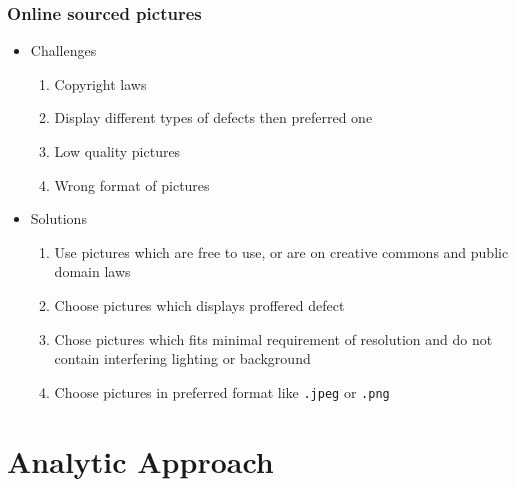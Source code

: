 \documentclass[12pt,a4paper]{article}
\begin{document}
\subsubsection{Online sourced pictures}
\begin{itemize}
    \item Challenges
    \begin{enumerate}
        \item Copyright laws
        \item Display different types of defects then preferred one
        \item Low quality pictures
        \item Wrong format of pictures 
    \end{enumerate}
    \item Solutions
    \begin{enumerate}
        \item Use pictures which are free to use, or are on creative commons and public domain laws 
        \item Choose pictures which displays proffered defect  
        \item Chose pictures which fits minimal requirement of resolution and do not contain interfering lighting or background
        \item Choose pictures in preferred format like \verb|.jpeg| or \verb|.png| 
    \end{enumerate}
\end{itemize}


\section{Analytic Approach}
\end{document}
